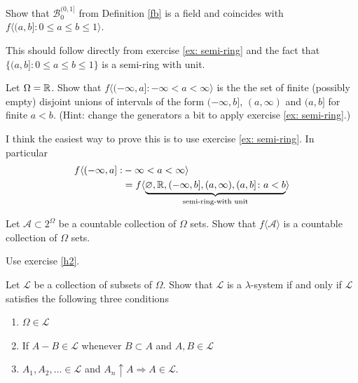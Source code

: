 \begin{exercise} \label{stofB}
Show that  $\mathcal B_0^{(0,1]}$ from Definition \ref{fb} is a field and coincides with $f\langle (a,b]: 0\leq a\leq b\leq 1 \rangle $.
\end{exercise}

\begin{exerciseproof}
This should follow directly from exercise \ref{ex: semi-ring} and the fact that $\{ (a,b]: 0\leq a\leq b\leq 1 \}$ is a semi-ring with unit.
\end{exerciseproof}


\begin{exercise}
\label{ex1}
Let $\Omega = \Bbb R$.
Show that $f\langle (-\infty,a]: -\infty< a< \infty\rangle$  is the the set of finite (possibly empty) disjoint unions of intervals of the form $(-\infty, b]$, $(a,\infty)$ and $(a,b]$ for finite $a < b$. (Hint:  change the generators a bit to apply exercise \ref{ex: semi-ring}.)
\end{exercise}

\begin{exerciseproof}
  I think the easiest way to prove this is to use exercise \ref{ex: semi-ring}. In particular
\begin{align*}
f\langle (-\infty,a]:& -\infty< a< \infty\rangle \\
&= f\langle \underbrace{\varnothing, \Bbb R, (-\infty, b], (a,\infty), (a,b]\colon a < b}_{\text{semi-ring-with unit}} \rangle
\end{align*}

\end{exerciseproof}


\begin{exercise} \label{countablly generated}
Let $\mathcal A\subset2^\Omega$ be a countable collection of $\Omega$ sets.
Show that  $f\langle\mathcal A\rangle$ is a  countable collection of $\Omega$ sets.
\end{exercise}

\begin{exerciseproof}
Use  exercise \ref{h2}.
\end{exerciseproof}



\begin{exercise}
Let $\mathcal L$ be a collection of subsets of $\Omega$. Show that $\mathcal L$ is a $\lambda$-system if and only if $\mathcal L$ satisfies the following three conditions
\begin{enumerate}
\item $\Omega \in \mathcal L$
\item If $A-B\in \mathcal L$ whenever $B\subset A$ and $A, B\in \mathcal L$
\item $A_1, A_2,\ldots\in\mathcal L$ and $A_n\uparrow A \Longrightarrow A\in\mathcal L$.
\end{enumerate}
\end{exercise}

